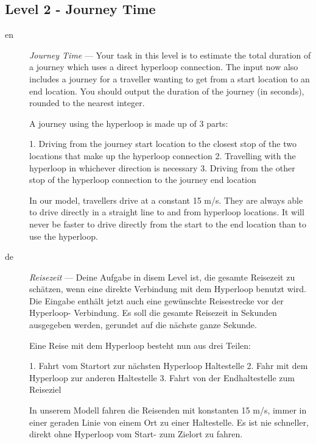 \documentclass[a4paper,11pt]{article}
\begin{document}
\subsection{Level 2 - Journey Time}

\begin{description} %
  \item[en] \emph{Journey Time} --- 
    Your task in this level is to estimate the total duration of a journey which
    uses a direct hyperloop connection.
    The input now also includes a journey for a traveller wanting to get from a
    start location to an end location.
    You should output the duration of the journey (in seconds), rounded to the
    nearest integer.
    
    A journey using the hyperloop is made up of 3 parts:
    
     1. Driving from the journey start location to the closest stop of the two
        locations that make up the hyperloop connection
     2. Travelling with the hyperloop in whichever direction is necessary
     3. Driving from the other stop of the hyperloop connection to the journey end
        location
    
    In our model, travellers drive at a constant 15 m/s. They are always able to
    drive directly in a straight line to and from hyperloop locations.
    It will never be faster to drive directly from the start to the end location
    than to use the hyperloop.
  
  \item[de] \emph{Reisezeit} --- 
    Deine Aufgabe in disem Level ist, die gesamte Reisezeit zu schätzen, wenn eine
    direkte Verbindung mit dem Hyperloop benutzt wird.
    Die Eingabe enthält jetzt auch eine gewünschte Reisestrecke vor der Hyperloop-
    Verbindung.
    Es soll die gesamte Reisezeit in Sekunden ausgegeben werden, gerundet auf die
    nächste ganze Sekunde.
    
    Eine Reise mit dem Hyperloop besteht nun aus drei Teilen:
    
     1. Fahrt vom Startort zur nächsten Hyperloop Haltestelle
     2. Fahr mit dem Hyperloop zur anderen Haltestelle
     3. Fahrt von der Endhaltestelle zum Reiseziel
    
    In unserem Modell fahren die Reisenden mit konstanten 15 m/s, immer in einer
    geraden Linie von einem Ort zu einer Haltestelle. Es ist nie schneller, direkt
    ohne Hyperloop vom Start- zum Zielort zu fahren.
  
\end{description}
\end{document}
